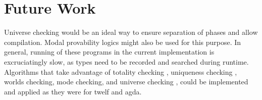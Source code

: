 \section{Future Work}

Universe checking would be an ideal way to ensure separation of phases and allow compilation. 
Modal provability logics might also be used for this purpose.  
In general, running of these programs in the current implementation is excruciatingly slow, 
as types need to be recorded and searched during runtime.  
Algorithms that take advantage of totality checking \citep{altenkirch2010termination}, 
uniqueness checking \citep{anderson2004verifying}, 
worlds checking\citep{anderson2004verifying}, 
mode checking\citep{anderson2004verifying}, 
and universe checking \citep{harper1991type}, 
could be implemented and applied as they were for twelf and agda.  
